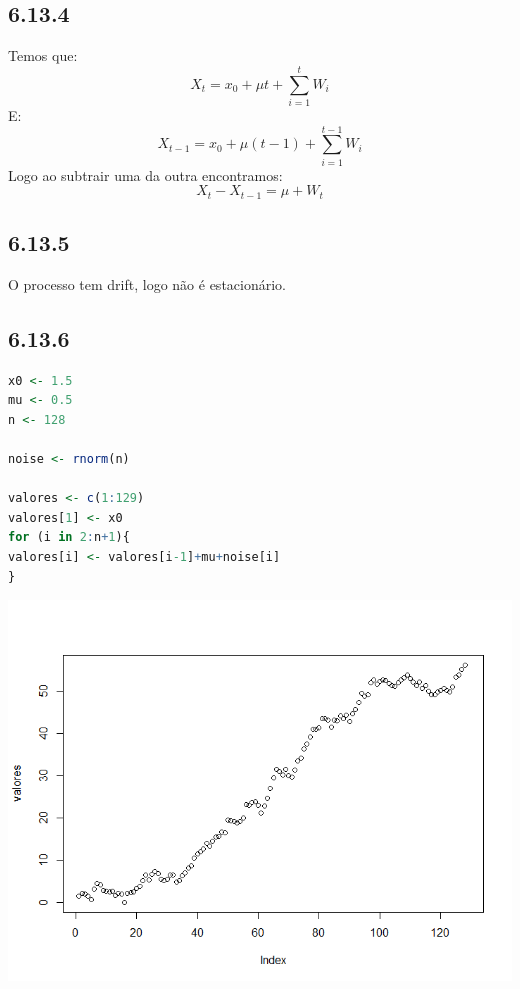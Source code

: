 \documentclass[12pt]{article}
\begin{document}
\subsection*{6.13.4}
Temos que:
\begin{equation*}
X_{t}=x_{0}+\mu t + \sum_{i=1}^{t}W_{i}
\end{equation*}
E:
\begin{equation*}
X_{t-1}=x_{0}+\mu (t-1) + \sum_{i=1}^{t-1}W_{i}
\end{equation*}
Logo ao subtrair uma da outra encontramos:
\begin{equation*}
X_{t}-X_{t-1}=\mu+W_{t}
\end{equation*}

\subsection*{6.13.5}
O processo tem drift, logo não é estacionário.

\subsection*{6.13.6}
\begin{lstlisting}[language=R]
x0 <- 1.5
mu <- 0.5
n <- 128

noise <- rnorm(n)

valores <- c(1:129)
valores[1] <- x0
for (i in 2:n+1){
valores[i] <- valores[i-1]+mu+noise[i]
}
\end{lstlisting}

\begin{center}
	\includegraphics*[scale=0.8]{4.png}
\end{center}
\end{document}
